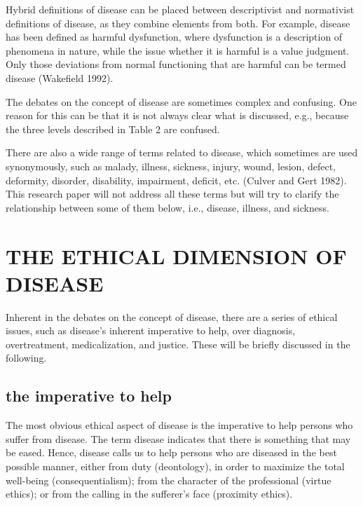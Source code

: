 \documentclass[conference]{IEEEtran}
\begin{document}
Hybrid deﬁnitions of disease can be placed between descriptivist and normativist deﬁnitions of disease, as they combine elements from both. For example, disease has been deﬁned as harmful dysfunction, where dysfunction is a description of phenomena in nature, while the issue whether it is harmful is a value judgment. Only those deviations from normal functioning that are harmful can be termed disease (Wakeﬁeld 1992).

The debates on the concept of disease are sometimes complex and confusing. One reason for this can be that it is not always clear what is discussed, e.g., because the three levels described in Table 2 are confused.

There are also a wide range of terms related to disease, which sometimes are used synonymously, such as malady, illness, sickness, injury, wound, lesion, defect, deformity, disorder, disability, impairment, deﬁcit, etc. (Culver and Gert 1982). This research paper will not address all these terms but will try to clarify the relationship between some of them below, i.e., disease, illness, and sickness.



\section{THE ETHICAL DIMENSION OF DISEASE}
Inherent in the debates on the concept of disease, there are a series of ethical issues, such as \cite{b3}disease’s inherent imperative to help, over diagnosis, overtreatment, medicalization, and justice. These will be brieﬂy discussed in the following.
\subsection{the imperative to help}\label{AA}
The most obvious ethical aspect of disease is the imperative to help persons who suffer from disease. The term disease indicates that there is something that may be eased. Hence, disease calls us to help persons who are diseased in the best possible manner, either from duty (deontology), in order to maximize the total well-being (consequentialism); from the character of the professional (virtue ethics); or from the calling in the sufferer’s face (proximity ethics).
\end{document}
